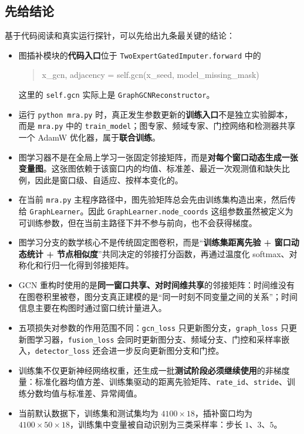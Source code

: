 \documentclass[UTF8]{ctexart}
\begin{document}
\subsection{先给结论}

基于代码阅读和真实运行探针，可以先给出九条最关键的结论：
\begin{itemize}
    \item 图插补模块的\textbf{代码入口}位于 \texttt{TwoExpertGatedImputer.forward} 中的
    \begin{quote}
        \ttfamily\small
        x\_gcn, adjacency = self.gcn(x\_seed, model\_missing\_mask)
    \end{quote}
    这里的 \texttt{self.gcn} 实际上是 \texttt{GraphGCNReconstructor}。
    \item 运行 \texttt{python mra.py} 时，真正发生参数更新的\textbf{训练入口}不是独立实验脚本，而是 \texttt{mra.py} 中的 \texttt{train\_model}；图专家、频域专家、门控网络和检测器共享一个 AdamW 优化器，属于\textbf{联合训练}。
    \item 图学习器不是在全局上学习一张固定邻接矩阵，而是\textbf{对每个窗口动态生成一张变量图}。这张图依赖于该窗口内的均值、标准差、最近一次观测值和缺失比例，因此是窗口级、自适应、按样本变化的。
    \item 在当前 \texttt{mra.py} 主程序路径中，图先验矩阵总会先由训练集构造出来，然后传给 \texttt{GraphLearner}。因此 \texttt{GraphLearner.node\_coords} 这组参数虽然被定义为可训练参数，但在当前主路径下并不参与前向，也不会获得梯度。
    \item 图学习分支的数学核心不是传统固定图卷积，而是“\textbf{训练集距离先验 + 窗口动态统计 + 节点相似度}”共同决定的邻接打分函数，再通过温度化 softmax、对称化和行归一化得到邻接矩阵。
    \item GCN 重构时使用的是\textbf{同一窗口共享、对时间维共享}的邻接矩阵：时间维没有在图卷积里被卷，图分支真正建模的是“同一时刻不同变量之间的关系”；时间信息主要在构图时通过窗口统计量进入。
    \item 五项损失对参数的作用范围不同：\texttt{gcn\_loss} 只更新图分支，\texttt{graph\_loss} 只更新图学习器，\texttt{fusion\_loss} 会同时更新图分支、频域分支、门控和采样率嵌入，\texttt{detector\_loss} 还会进一步反向更新图分支和门控。
    \item 训练集不仅更新神经网络权重，还生成一批\textbf{测试阶段必须继续使用}的非梯度量：标准化器均值方差、训练集驱动的距离先验矩阵、\texttt{rate\_id}、\texttt{stride}、训练分数均值与标准差、异常阈值。
    \item 当前默认数据下，训练集和测试集均为 \(4100 \times 18\)，插补窗口均为 \(4100 \times 50 \times 18\)，训练集中变量被自动识别为三类采样率：步长 \(1\)、\(3\)、\(5\)。
\end{itemize}
\end{document}
